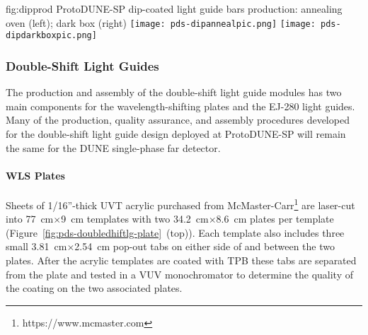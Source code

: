 \begin{dunefigure}{fig:dipprod}
{ProtoDUNE-SP dip-coated light guide bars production: annealing oven (left); dark box (right)}
  \texttt{[image: pds-dipannealpic.png]}
  \texttt{[image: pds-dipdarkboxpic.png]}
\end{dunefigure}




\subsubsection{Double-Shift Light Guides}
\label{ssec:fdsp-pd-pc-prod-bar2}

The production and assembly of the double-shift light guide modules has two main components for the wavelength-shifting plates and the EJ-280 light guides. Many of the production, quality assurance, and assembly procedures developed for the double-shift light guide design deployed at ProtoDUNE-SP will remain the same for the DUNE single-phase far detector.
													
\paragraph*{WLS Plates}

Sheets of 1/16''-thick UVT acrylic purchased from McMaster-Carr\footnote{https://www.mcmaster.com} are laser-cut into \SI{77}{cm}$\times$\SI{9}{cm} templates with two \SI{34.2}{cm}$\times$\SI{8.6}{cm} plates per template (Figure~\ref{fig:pds-doubledhiftlg-plate}~(top)). Each template also includes three small \SI{3.81}{cm}$\times$\SI{2.54}{cm} pop-out tabs on either side of and between the two plates. After the acrylic templates are coated with TPB these tabs are separated from the plate and tested in a VUV monochromator to determine the quality of the coating on the two associated plates.

